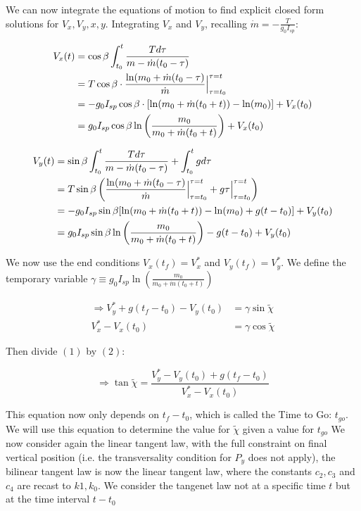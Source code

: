 \documentclass{article}
\begin{document}
We can now integrate the equations of motion to find explicit closed form solutions for $V_x, V_y, x,y$. Integrating $V_x$ and $V_y$, recalling $\dot{m} = -\frac{T}{g_0 I_{sp}}$: 

\begin{align*}
V_x(t) &= \cos{\beta}\int_{t_0}^{t} \frac{Td\tau}{m-\dot{m}(t_0 - \tau)}\notag \\
&= T\cos{\beta} \cdot \frac{\ln (m_0 + \dot{m}(t_0 - \tau)}{\dot{m}}\Big|_{\tau = t_0}^{\tau = t}\notag \\
&= -g_0I_{sp}\cos\beta \cdot [\ln(m_0 + \dot{m}(t_0 + t)) - \ln(m_0)] + V_x(t_0)\notag \\
&= g_0I_{sp}\cos\beta\ln\left(\frac{m_0}{m_0 + \dot{m}(t_0 + t)}\right) + V_x(t_0)
\end{align*}

\begin{align*}
V_y(t) &= \sin{\beta}\int_{t_0}^{t} \frac{Td\tau}{m-\dot{m}(t_0 - \tau)} + \int_{t_0}^{t} gd\tau\notag\\
&= T\sin{\beta} \left (\frac{\ln (m_0 + \dot{m}(t_0 - \tau)}{\dot{m}}\Big|_{\tau = t_0}^{\tau = t}  + g\tau\Big|_{\tau = t_0}^{\tau = t} \right )\notag \\
&= -g_0I_{sp}\sin\beta  [\ln(m_0 + \dot{m}(t_0 + t)) - \ln(m_0) + g(t - t_0)] + V_y(t_0)\notag \\
&= g_0I_{sp}\sin\beta\ln\left(\frac{m_0}{m_0 + \dot{m}(t_0 + t)}\right)  - g(t - t_0)+ V_y(t_0)
\end{align*}

We now use the end conditions $V_x(t_f) = V_x^*$ and $V_y(t_f) = V_y^*$. We define the temporary variable $\gamma \equiv g_0I_{sp}\ln\left(\frac{m_0}{m_0 + \dot{m}(t_0 + t)}\right)$

\begin{align}
\Rightarrow V_y^* + g(t_f - t_0) - V_y(t_0) &= \gamma\sin\tilde\chi \\
V_x^* - V_x(t_0) & = \gamma\cos\tilde\chi
\end{align}

Then divide $(1)$ by $(2)$: 

\begin{equation}
\Rightarrow \tan\tilde\chi = \frac{V_y^* - V_y(t_0) + g(t_f - t_0)}{V_x^* - V_x(t_0)}
\label{eq:three}
\end{equation}

This equation now only depends on $t_f - t_0$, which is called the Time to Go: $t_{go}$. We will use this equation to determine the value for $\tilde\chi$ given a value for 
$t_{go}$ \newline
We now consider again the linear tangent law, with the full constraint on final vertical position (i.e. the transversality condition for $P_y$ does not apply), the bilinear 
tangent law is now the linear tangent law, where the constants $c_2, c_3 $ and $c_4$ are recast to $k1,k_0$. We consider the tangenet law not at a specific time $t$ but at 
the time interval $t - t_0$
\end{document}
